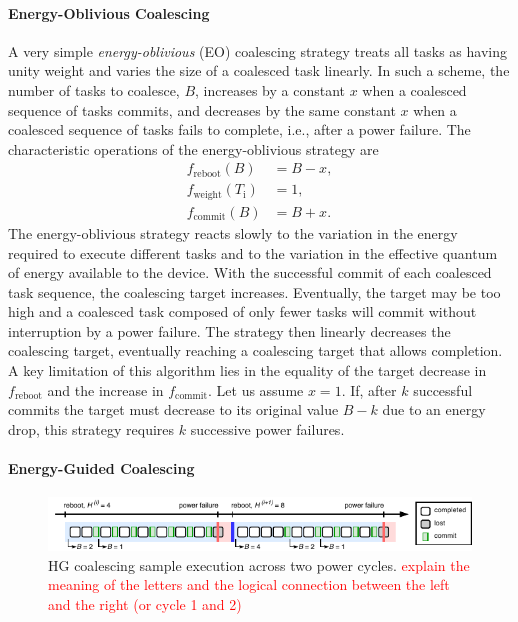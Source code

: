 \paragraph{Energy-Oblivious Coalescing}
\label{subsec:energyBlind}
 
A very simple {\em energy-oblivious} (EO) coalescing strategy treats all tasks as having unity weight and varies the size of a coalesced task linearly. In such a scheme, the number of tasks to coalesce, $B$, increases by a constant $x$ when a coalesced sequence of tasks commits, and decreases by the same constant $x$ when a coalesced sequence of tasks fails to complete, i.e., after a power failure. The characteristic operations of the energy-oblivious strategy are
%
\begin{equation}
	\begin{split}
		f_\text{reboot}(B) & = B - x, \\
		f_\text{weight}(T_\text{i}) & =  1, \\
		f_\text{commit}(B) & = B + x.
	\end{split}
	\label{eq:eo}
\end{equation}
%
The energy-oblivious strategy reacts slowly to the variation in the energy required to execute different tasks and to the variation in the effective quantum of energy available to the device. With the successful commit of each coalesced task sequence, the coalescing target increases. Eventually, the target may be too high and a coalesced task composed of only fewer tasks will commit without interruption by a power failure. The strategy then linearly decreases the coalescing target, eventually reaching a coalescing target that allows completion. A key limitation of this algorithm lies in the equality of the target decrease in $f_\text{reboot}$ and the increase in $f_\text{commit}$. Let us assume $x=1$. If, after $k$ successful commits the target must decrease to its original value $B-k$ due to an energy drop, this strategy requires $k$ successive power failures.

\paragraph{Energy-Guided Coalescing}
\label{subsec:energyAware}

\begin{figure}
    \includegraphics[width=\linewidth]{figures/hg-coal-horiz.pdf}
    \caption{HG coalescing sample execution across two power cycles. \textcolor{red}{explain the meaning of the letters and the logical connection between the left and the right (or cycle 1 and 2)}}
    \label{fig:hg-coal}
\end{figure}

